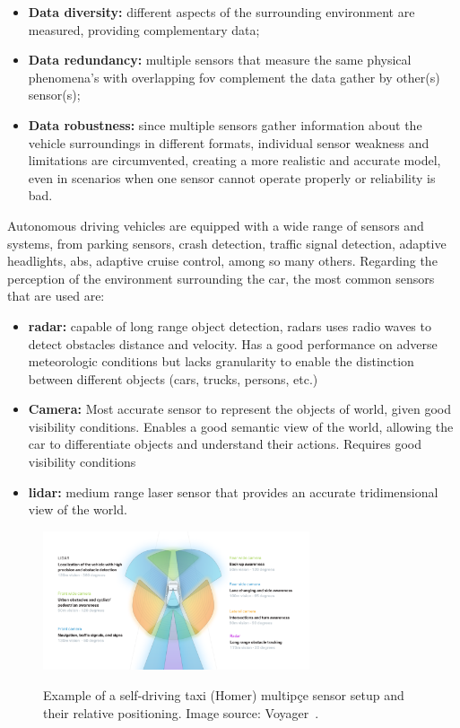 \begin{itemize}
	\item \textbf{Data diversity:} different aspects of the surrounding environment are measured, providing complementary data;
	\item \textbf{Data redundancy:} multiple sensors that measure the same physical phenomena's with overlapping \ac{fov} complement the data gather by other(s) sensor(s);
	\item \textbf{Data robustness:} since multiple sensors gather information about the vehicle surroundings in different formats, individual sensor weakness and limitations are circumvented, creating a more realistic and accurate model, even in scenarios when one sensor cannot operate properly or reliability is bad.
\end{itemize}

Autonomous driving vehicles are equipped with a wide range of sensors and systems, from parking sensors, crash detection, traffic signal detection, adaptive headlights, \ac{abs}, adaptive cruise control, among so many others. Regarding the perception of the environment surrounding the car, the most common sensors that are used are:

\begin{itemize}
	\item \textbf{\ac{radar}:} capable of long range object detection, \acp{radar} uses radio waves to detect obstacles distance and velocity. Has a good performance on adverse meteorologic conditions but lacks granularity to enable the distinction between different objects (cars, trucks, persons, etc.)
	\item \textbf{Camera:} Most accurate sensor to represent the objects of world, given good visibility conditions. Enables a good semantic view of the world, allowing the car to differentiate objects and understand their actions. Requires good visibility conditions 
	\item \textbf{\ac{lidar}:} medium range laser sensor that provides an accurate tridimensional view of the world.
\end{itemize}

\begin{figure}
	\centering
	\includegraphics[width=0.7\textwidth]{img/sensor_fusion/homer_setup.png}
	\label{fig:introduction:homer_setup}
	\caption{Example of a self-driving taxi (Homer) multipçe sensor setup and their relative positioning. Image source: Voyager~\cite{Cameron}.}
\end{figure}

